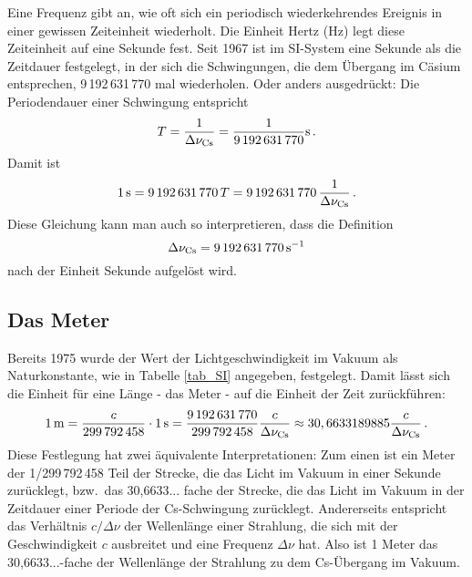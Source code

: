 Eine Frequenz gibt an, 
wie oft sich ein periodisch wiederkehrendes Ereignis in einer gewissen
Zeiteinheit wiederholt. Die Einheit Hertz (Hz) legt diese Zeiteinheit auf eine Sekunde fest. 
Seit 1967 ist im SI-System eine Sekunde als die Zeitdauer festgelegt, in der sich die Schwingungen, die dem \"Ubergang im
C\"asium entsprechen, 9\,192\,631\,770 mal wiederholen. Oder anders ausgedr\"uckt: Die 
Periodendauer einer Schwingung entspricht 
\begin{equation}
               T = \frac{1}{\Delta \nu_{\rm Cs}} = \frac{1}{ 9\,192\,631\,770} {\rm s} \, .
\end{equation}  
Damit ist
\begin{equation}
               1\,{\rm s}  =  9\,192\,631\,770 \, T = 9\,192\,631\,770 \, \frac{1}{\Delta \nu_{\rm Cs}} \, .
\end{equation}  
Diese Gleichung kann man auch so interpretieren, dass die Definition
\begin{equation}
               \Delta \nu_{\rm Cs}  =  9\,192\,631\,770 \, {\rm s}^{-1}
\end{equation}  
nach der Einheit Sekunde aufgel\"ost wird. 

\subsection{Das Meter}

Bereits 1975 wurde der Wert der Lichtgeschwindigkeit 
im Vakuum als Naturkonstante,
wie in Tabelle \ref{tab_SI} angegeben, festgelegt. Damit l\"asst sich die Einheit f\"ur
eine L\"ange - das Meter - auf die Einheit der Zeit zur\"uckf\"uhren:
\begin{equation}
              1\,{\rm m} =                 \frac{c}{299\,792\,458} \cdot 1 \,{\rm s} = 
              \frac{9\,192\,631\,770}{299\,792\,458} \frac{c}{\Delta \nu_{\rm Cs}} 
                 \approx  30,6633189885 \frac{c}{\Delta \nu_{\rm Cs}} \, .
\end{equation}  
Diese Festlegung hat zwei \"aquivalente Interpretationen: Zum einen ist ein Meter der
1/299\,792\,458 Teil der Strecke, die das Licht im Vakuum in einer Sekunde zur\"ucklegt,
bzw.\ das 30,6633... fache der Strecke, die das Licht im Vakuum in der Zeitdauer einer Periode
der Cs-Schwingung zur\"ucklegt. Andererseits entspricht das Verh\"altnis $c/\Delta \nu$
der Wellenl\"ange einer Strahlung, die sich mit der Geschwindigkeit $c$ ausbreitet und eine
Frequenz $\Delta \nu$ hat. Also ist 1 Meter das 30,6633...-fache der 
Wellenl\"ange der Strahlung
zu dem Cs-\"Ubergang im Vakuum. 

